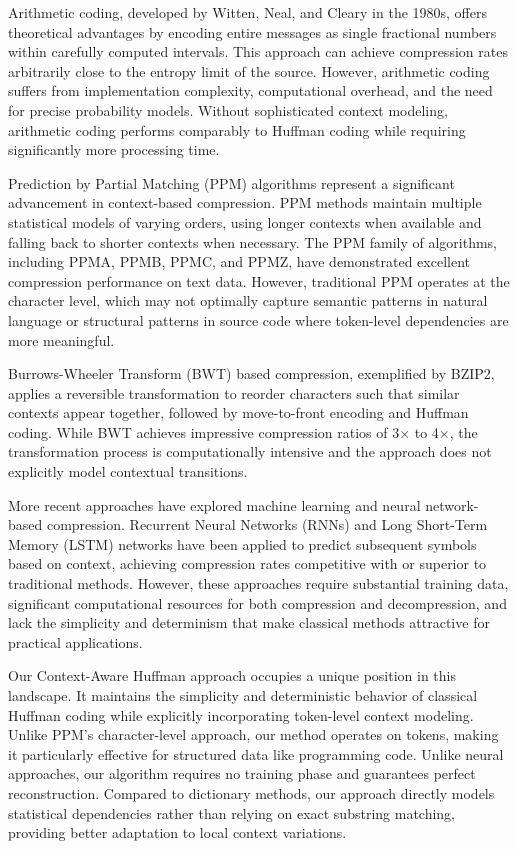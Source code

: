 \documentclass[conference]{IEEEtran}
\begin{document}
Arithmetic coding, developed by Witten, Neal, and Cleary in the 1980s, offers theoretical advantages by encoding entire messages as single fractional numbers within carefully computed intervals. This approach can achieve compression rates arbitrarily close to the entropy limit of the source. However, arithmetic coding suffers from implementation complexity, computational overhead, and the need for precise probability models. Without sophisticated context modeling, arithmetic coding performs comparably to Huffman coding while requiring significantly more processing time.

Prediction by Partial Matching (PPM) algorithms represent a significant advancement in context-based compression. PPM methods maintain multiple statistical models of varying orders, using longer contexts when available and falling back to shorter contexts when necessary. The PPM family of algorithms, including PPMA, PPMB, PPMC, and PPMZ, have demonstrated excellent compression performance on text data. However, traditional PPM operates at the character level, which may not optimally capture semantic patterns in natural language or structural patterns in source code where token-level dependencies are more meaningful.

Burrows-Wheeler Transform (BWT) based compression, exemplified by BZIP2, applies a reversible transformation to reorder characters such that similar contexts appear together, followed by move-to-front encoding and Huffman coding. While BWT achieves impressive compression ratios of 3× to 4×, the transformation process is computationally intensive and the approach does not explicitly model contextual transitions.

More recent approaches have explored machine learning and neural network-based compression. Recurrent Neural Networks (RNNs) and Long Short-Term Memory (LSTM) networks have been applied to predict subsequent symbols based on context, achieving compression rates competitive with or superior to traditional methods. However, these approaches require substantial training data, significant computational resources for both compression and decompression, and lack the simplicity and determinism that make classical methods attractive for practical applications.

Our Context-Aware Huffman approach occupies a unique position in this landscape. It maintains the simplicity and deterministic behavior of classical Huffman coding while explicitly incorporating token-level context modeling. Unlike PPM's character-level approach, our method operates on tokens, making it particularly effective for structured data like programming code. Unlike neural approaches, our algorithm requires no training phase and guarantees perfect reconstruction. Compared to dictionary methods, our approach directly models statistical dependencies rather than relying on exact substring matching, providing better adaptation to local context variations.
\end{document}

